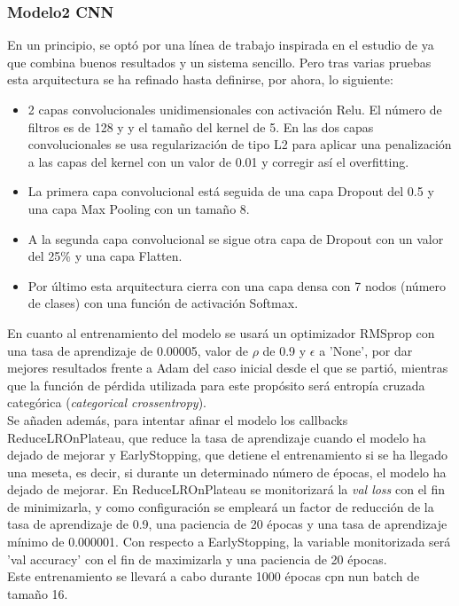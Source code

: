 \documentclass[11pt,a4paper,spanish]{book}
\begin{document}
		\subsubsection{Modelo2 CNN}
		\label{cap4:Modelo2}
		En un principio, se optó por una línea de trabajo inspirada en el estudio de \cite{AbdulQayyum2019} ya que combina buenos resultados y un sistema sencillo. Pero tras varias pruebas esta arquitectura se ha refinado hasta definirse, por ahora, lo siguiente:
		
		\begin{itemize}
			\item 2 capas convolucionales unidimensionales con activación Relu. El número de filtros es de 128 y  y el tamaño del kernel de 5.
			En las dos capas convolucionales se usa regularización de tipo L2 para aplicar una penalización a las capas del kernel con un valor de 0.01 y corregir así el overfitting.
			
			\item La primera capa convolucional está seguida de una capa Dropout del 0.5 y una capa Max Pooling con un tamaño 8.
			
			\item A la segunda capa convolucional se sigue otra capa de Dropout con un valor del 25\% y una capa Flatten.
			
			\item Por último esta arquitectura cierra con una capa densa con 7 nodos (número de clases) con una función de activación Softmax.
		\end{itemize}
	
	En cuanto al entrenamiento del modelo se usará un optimizador RMSprop con una tasa de aprendizaje de 0.00005, valor de $\rho$ de 0.9 y $\epsilon$ a 'None', por dar mejores resultados frente a Adam del caso inicial desde el que se partió, mientras que la función de pérdida utilizada para este propósito será entropía cruzada categórica (\emph{categorical crossentropy}).\\
	Se añaden además, para intentar afinar el modelo los callbacks ReduceLROnPlateau, que reduce la tasa de aprendizaje cuando el modelo ha dejado de mejorar y EarlyStopping, que detiene el entrenamiento si se ha llegado una meseta, es decir, si durante un determinado número de épocas, el modelo ha dejado de mejorar. En ReduceLROnPlateau se monitorizará la \emph{val loss} con el fin de minimizarla, y como configuración se empleará un factor de reducción de la tasa de aprendizaje de 0.9, una paciencia de 20 épocas y una tasa de aprendizaje mínimo de 0.000001.
	Con respecto a EarlyStopping, la variable monitorizada será 'val accuracy' con el fin de maximizarla y una paciencia de 20 épocas.\\
	Este entrenamiento se llevará a cabo durante 1000 épocas cpn nun batch de tamaño 16.
\end{document}
